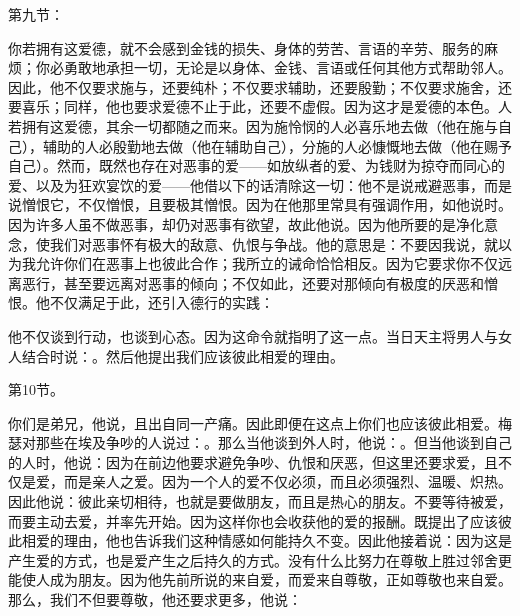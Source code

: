 第九节：\par

你若拥有这爱德，就不会感到金钱的损失、身体的劳苦、言语的辛劳、服务的麻烦；你必勇敢地承担一切，无论是以身体、金钱、言语或任何其他方式帮助邻人。因此，他不仅要求施与，还要纯朴；不仅要求辅助，还要殷勤；不仅要求施舍，还要喜乐；同样，他也要求爱德不止于此，还要不虚假。因为这才是爱德的本色。人若拥有这爱德，其余一切都随之而来。因为施怜悯的人必喜乐地去做（他在施与自己），辅助的人必殷勤地去做（他在辅助自己），分施的人必慷慨地去做（他在赐予自己）。然而，既然也存在对恶事的爱——如放纵者的爱、为钱财为掠夺而同心的爱、以及为狂欢宴饮的爱——他借以下的话清除这一切：他不是说戒避恶事，而是说憎恨它，不仅憎恨，且要极其憎恨。因为在他那里常具有强调作用，如他说时。因为许多人虽不做恶事，却仍对恶事有欲望，故此他说。因为他所要的是净化意念，使我们对恶事怀有极大的敌意、仇恨与争战。他的意思是：不要因我说，就以为我允许你们在恶事上也彼此合作；我所立的诫命恰恰相反。因为它要求你不仅远离恶行，甚至要远离对恶事的倾向；不仅如此，还要对那倾向有极度的厌恶和憎恨。他不仅满足于此，还引入德行的实践：\par

他不仅谈到行动，也谈到心态。因为这命令就指明了这一点。当日天主将男人与女人结合时说：。然后他提出我们应该彼此相爱的理由。\par

第10节。\par

你们是弟兄，他说，且出自同一产痛。因此即便在这点上你们也应该彼此相爱。梅瑟对那些在埃及争吵的人说过：。那么当他谈到外人时，他说：。但当他谈到自己的人时，他说：因为在前边他要求避免争吵、仇恨和厌恶，但这里还要求爱，且不仅是爱，而是亲人之爱。因为一个人的爱不仅必须，而且必须强烈、温暖、炽热。因此他说：彼此亲切相待，也就是要做朋友，而且是热心的朋友。不要等待被爱，而要主动去爱，并率先开始。因为这样你也会收获他的爱的报酬。既提出了应该彼此相爱的理由，他也告诉我们这种情感如何能持久不变。因此他接着说：因为这是产生爱的方式，也是爱产生之后持久的方式。没有什么比努力在尊敬上胜过邻舍更能使人成为朋友。因为他先前所说的来自爱，而爱来自尊敬，正如尊敬也来自爱。那么，我们不但要尊敬，他还要求更多，他说：\par

